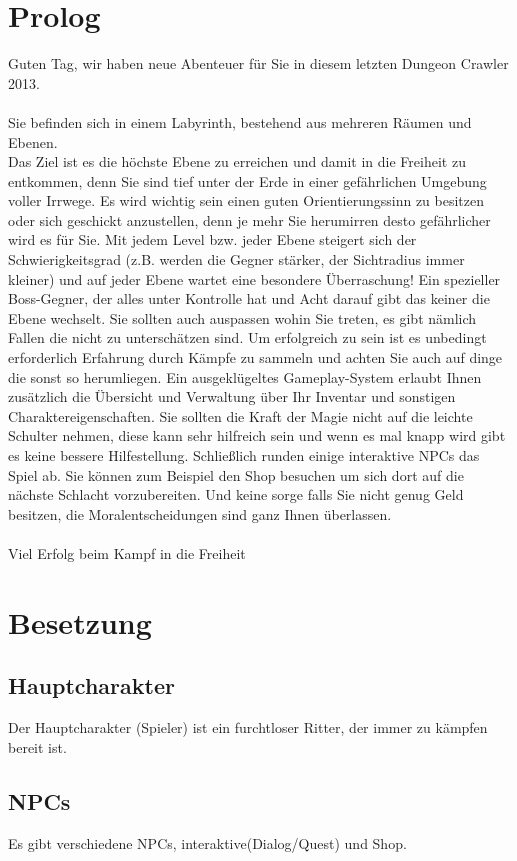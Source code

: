 \documentclass[12pt, a4paper]{scrreprt}
\begin{document}
\section{Prolog}
Guten Tag, wir haben neue Abenteuer für Sie in diesem letzten Dungeon Crawler 2013.\\\\
Sie befinden sich in einem Labyrinth, bestehend aus mehreren Räumen und Ebenen.\\
Das Ziel ist es die höchste Ebene zu erreichen und damit in die Freiheit zu entkommen, denn Sie sind tief unter der Erde in einer gefährlichen Umgebung voller Irrwege. Es wird wichtig sein einen guten Orientierungssinn zu besitzen oder sich geschickt anzustellen, denn je mehr Sie herumirren desto gefährlicher wird es für Sie. Mit jedem Level bzw. jeder Ebene steigert sich der Schwierigkeitsgrad (z.B. werden die Gegner stärker, der Sichtradius immer kleiner) und auf jeder Ebene wartet eine besondere Überraschung! Ein spezieller Boss-Gegner, der alles unter Kontrolle hat und Acht darauf gibt das keiner die Ebene wechselt. Sie sollten auch auspassen wohin Sie treten, es gibt nämlich Fallen die nicht zu unterschätzen sind. Um erfolgreich zu sein ist es unbedingt erforderlich Erfahrung durch Kämpfe zu sammeln und achten Sie auch auf dinge die sonst so herumliegen. Ein ausgeklügeltes Gameplay-System erlaubt Ihnen zusätzlich die Übersicht und Verwaltung über Ihr Inventar und sonstigen Charaktereigenschaften. Sie sollten die Kraft der Magie nicht auf die leichte Schulter nehmen, diese kann sehr hilfreich sein und wenn es mal knapp wird gibt es keine bessere Hilfestellung. Schließlich runden einige interaktive NPCs das Spiel ab. Sie können zum Beispiel den Shop besuchen um sich dort auf die nächste Schlacht vorzubereiten. Und keine sorge falls Sie nicht genug Geld besitzen, die Moralentscheidungen sind ganz Ihnen überlassen.\\\\
Viel Erfolg beim Kampf in die Freiheit
\section{Besetzung}
\subsection*{Hauptcharakter}
Der Hauptcharakter (Spieler) ist ein furchtloser Ritter, der immer zu kämpfen bereit ist.
\subsection*{NPCs}
Es gibt verschiedene NPCs, interaktive(Dialog/Quest) und Shop.
\end{document}
